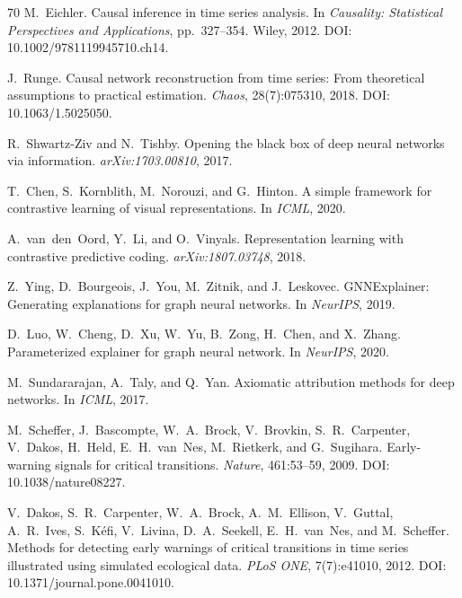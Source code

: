 \documentclass[11pt]{article}
\begin{document}
\begin{thebibliography}{70}
M.~Eichler.
\newblock Causal inference in time series analysis.
\newblock In \emph{Causality: Statistical Perspectives and Applications}, pp.~327--354. Wiley, 2012. DOI: 10.1002/9781119945710.ch14.

J.~Runge.
\newblock Causal network reconstruction from time series: From theoretical assumptions to practical estimation.
\newblock \emph{Chaos}, 28(7):075310, 2018. DOI: 10.1063/1.5025050.

R.~Shwartz-Ziv and N.~Tishby.
\newblock Opening the black box of deep neural networks via information.
\newblock \emph{arXiv:1703.00810}, 2017.

T.~Chen, S.~Kornblith, M.~Norouzi, and G.~Hinton.
\newblock A simple framework for contrastive learning of visual representations.
\newblock In \emph{ICML}, 2020.

A.~van~den~Oord, Y.~Li, and O.~Vinyals.
\newblock Representation learning with contrastive predictive coding.
\newblock \emph{arXiv:1807.03748}, 2018.

Z.~Ying, D.~Bourgeois, J.~You, M.~Zitnik, and J.~Leskovec.
\newblock GNNExplainer: Generating explanations for graph neural networks.
\newblock In \emph{NeurIPS}, 2019.

D.~Luo, W.~Cheng, D.~Xu, W.~Yu, B.~Zong, H.~Chen, and X.~Zhang.
\newblock Parameterized explainer for graph neural network.
\newblock In \emph{NeurIPS}, 2020.

M.~Sundararajan, A.~Taly, and Q.~Yan.
\newblock Axiomatic attribution methods for deep networks.
\newblock In \emph{ICML}, 2017.

M.~Scheffer, J.~Bascompte, W.~A.~Brock, V.~Brovkin, S.~R.~Carpenter, V.~Dakos, H.~Held, E.~H.~van~Nes, M.~Rietkerk, and G.~Sugihara.
\newblock Early-warning signals for critical transitions.
\newblock \emph{Nature}, 461:53--59, 2009. DOI: 10.1038/nature08227.

V.~Dakos, S.~R.~Carpenter, W.~A.~Brock, A.~M.~Ellison, V.~Guttal, A.~R.~Ives, S.~K{\'e}fi, V.~Livina, D.~A.~Seekell, E.~H.~van~Nes, and M.~Scheffer.
\newblock Methods for detecting early warnings of critical transitions in time series illustrated using simulated ecological data.
\newblock \emph{PLoS ONE}, 7(7):e41010, 2012. DOI: 10.1371/journal.pone.0041010.

\end{thebibliography}
\end{document}
